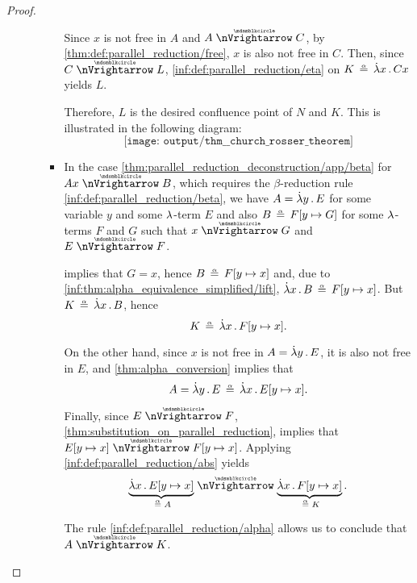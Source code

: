\begin{proof}
\begin{itemize}
\begin{itemize}
\begin{itemize}
        Since \( x \) is not free in \( A \) and \( A \ppred C \), by \cref{thm:def:parallel_reduction/free}, \( x \) is also not free in \( C \). Then, since \( C \ppred L \), \ref{inf:def:parallel_reduction/eta} on \( K \aequiv \qabs x C x \) yields \( L \).

        Therefore, \( L \) is the desired confluence point of \( N \) and \( K \). This is illustrated in the following diagram:
        \begin{equation*}
          \texttt{[image: output/thm\_\_church\_rosser\_theorem]}
        \end{equation*}

        \item In the case \cref{thm:parallel_reduction_deconstruction/app/beta} for \( Ax \ppred B \), which requires the \( \beta \)-reduction rule \ref{inf:def:parallel_reduction/beta}, we have \( A = \qabs y E \) for some variable \( y \) and some \( {\mathrm \lambda} \)-term \( E \) and also \( B \aequiv F[y \mapsto G] \) for some \( {\mathrm \lambda} \)-terms \( F \) and \( G \) such that \( x \ppred G \) and \( E \ppred F \).

         implies that \( G = x \), hence \( B \aequiv F[y \mapsto x] \) and, due to \ref{inf:thm:alpha_equivalence_simplified/lift}, \( \qabs x B \aequiv F[y \mapsto x] \). But \( K \aequiv \qabs x B \), hence
        \begin{equation*}
          K \aequiv \qabs x F[y \mapsto x].
        \end{equation*}

        On the other hand, since \( x \) is not free in \( A = \qabs y E \), it is also not free in \( E \), and \cref{thm:alpha_conversion} implies that
        \begin{equation*}
          A = \qabs y E \aequiv \qabs x E[y \mapsto x].
        \end{equation*}

        Finally, since \( E \ppred F \), \cref{thm:substitution_on_parallel_reduction}, implies that \( E[y \mapsto x] \ppred F[y \mapsto x] \). Applying \ref{inf:def:parallel_reduction/abs} yields
        \begin{equation*}
          \underbrace{\qabs x E[y \mapsto x]}_{\aequiv A} \ppred \underbrace{\qabs x F[y \mapsto x]}_{\aequiv K}.
        \end{equation*}

        The rule \ref{inf:def:parallel_reduction/alpha} allows us to conclude that \( A \ppred K \).


\end{itemize}
\end{itemize}
\end{itemize}
\end{proof}
